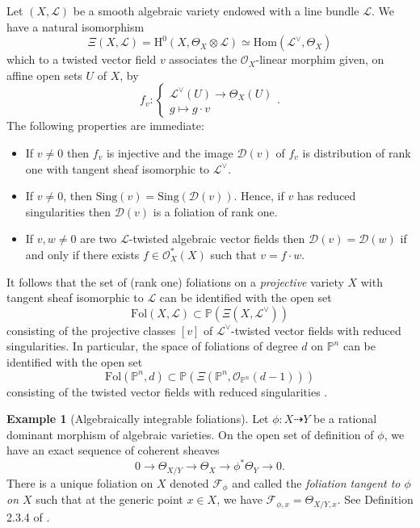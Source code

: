 \documentclass[12pt]{amsart}
\renewcommand{\P}{\mathbb{P}}
\theoremstyle{definition}
\newtheorem{example}[definition]{Example}
\theoremstyle{plain}
\theoremstyle{exampstyle}
\theoremstyle{exampstyle}\newtheorem{thmxbis}{Theorem}
\numberwithin{equation}{section}
\theoremstyle{remark}
\begin{document}
{\label{example-foliations of rank one} Let $(X,\mathcal L)$ be a smooth algebraic variety endowed with a line bundle $\mathcal L$.  We have a natural isomorphism 
$$\Xi(X,\mathcal L)  = \mathrm{H}^0(X,\Theta_X \otimes \mathcal L)  \simeq \mathrm{Hom}(\mathcal L^\vee, \Theta_X)   $$ 
which to a twisted vector field $v$ associates the $\mathcal O_X$-linear morphim given, on affine open sets $U$ of $X$, by
$$f_v: \begin{cases} 
\mathcal L^\vee(U) \rightarrow \Theta_X(U) 
\\ 
g \mapsto g\cdot v \end{cases}.$$
The following properties are immediate:
\begin{itemize} 
\item[(i)] If $v\neq 0$ then $f_v$ is injective and the image $\mathcal D(v)$ of $f_v$ is distribution of rank one with tangent sheaf isomorphic to $\mathcal L^\vee$.
\item[(ii)] If $v \neq 0$, then $\mathrm{Sing}(v) = \mathrm{Sing}(\mathcal D(v))$. Hence, if $v$ has reduced singularities then $\mathcal D(v)$ is a foliation of rank one. 

\item[(iii)] If $v,w \neq 0$ are two $\mathcal L$-twisted algebraic vector fields then $\mathcal D(v) = \mathcal D(w)$ if and only if there exists $f \in \mathcal O_X^\ast (X)$ such that $v = f \cdot w$. 
\end{itemize} 
It follows that the set of (rank one) foliations on a {\em projective} variety $X$ with tangent sheaf isomorphic to $\mathcal L$ can be identified with the open set   
$$
\mathrm{Fol}(X,\mathcal L) \subset \P(\Xi(X,\mathcal L^\vee))
$$
consisting of the projective classes $[v]$ of $\mathcal L^\vee$-twisted vector fields with reduced singularities. In particular, the space of foliations of degree $d$ on $\P^n$ can be identified with the open set 
\begin{equation} \mathrm{Fol}(\P^n,d) \subset \P(\Xi(\P^n,\mathcal O_{\P^n}(d-1)))
\end{equation}
consisting of the twisted vector fields with reduced singularities \cite[Section 8.1]{Pereira-JEMS}.
}


\begin{example}[Algebraically integrable foliations] \label{example-algebraically-integrable}
Let $\phi: X \dashrightarrow Y$ be a rational dominant morphism of algebraic varieties. On the open set of definition of $\phi$, we have an exact sequence of coherent sheaves  
$$ 0 \rightarrow \Theta_{X/Y} \rightarrow \Theta_X \rightarrow \phi^\ast \Theta_Y \rightarrow 0.$$ There is a unique foliation on $X$ denoted $\mathcal F_\phi$ and called the {\em{foliation tangent to $\phi$ on $X$}} such that at the generic point $x \in X$, we have $\mathcal F_{\phi,x} = \Theta_{X/Y,x}$.
See Definition 2.3.4 of \cite{jaoui-Confluentes}. 
\end{example}
\end{document}

